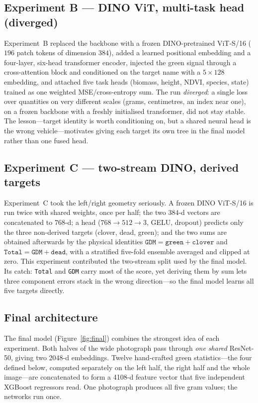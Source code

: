 \documentclass[11pt,a4paper]{article}
\begin{document}
\subsection{Experiment B --- DINO ViT, multi-task head (diverged)}
Experiment~B replaced the backbone with a frozen DINO-pretrained ViT-S/16 ($196$ patch tokens of
dimension $384$), added a learned positional embedding and a four-layer, six-head transformer
encoder, injected the green signal through a cross-attention block and conditioned on the target
name with a $5\times128$ embedding, and attached five task heads (biomass, height, NDVI, species,
state) trained as one weighted MSE/cross-entropy sum. The run \emph{diverged}: a single loss over
quantities on very different scales (grams, centimetres, an index near one), on a frozen backbone
with a freshly initialised transformer, did not stay stable. The lesson---target identity is worth
conditioning on, but a shared neural head is the wrong vehicle---motivates giving each target its
own tree in the final model rather than one fused head.

\subsection{Experiment C --- two-stream DINO, derived targets}
Experiment~C took the left/right geometry seriously. A frozen DINO ViT-S/16 is run twice with
shared weights, once per half; the two $384$-d vectors are concatenated to $768$-d; a head
($768\to512\to3$, GELU, dropout) predicts only the three non-derived targets (clover, dead,
green); and the two sums are obtained afterwards by the physical identities
$\texttt{GDM}=\texttt{green}+\texttt{clover}$ and
$\texttt{Total}=\texttt{GDM}+\texttt{dead}$, with a stratified five-fold ensemble averaged and
clipped at zero. This experiment contributed the two-stream split used by the final model. Its
catch: \texttt{Total} and \texttt{GDM} carry most of the score, yet deriving them by sum lets three
component errors stack in the wrong direction---so the final model learns all five targets
directly.

\subsection{Final architecture}\label{sec:finalarch}
The final model (Figure~\ref{fig:final}) combines the strongest idea of each experiment. Both halves
of the wide photograph pass through \emph{one shared} ResNet-50, giving two 2048-d embeddings.
Twelve hand-crafted green statistics---the four defined below, computed separately on the left half,
the right half and the whole image---are concatenated to form a 4108-d feature vector that five
independent XGBoost regressors read. One photograph produces all five gram values; the networks run
once.
\end{document}
